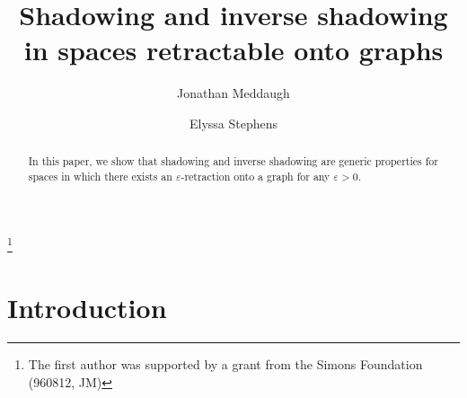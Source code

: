 \documentclass{amsart}
\numberwithin{equation}{section}
\begin{document}




\title[Graphoids]{Shadowing and inverse shadowing in spaces retractable onto graphs}

\author[J. Meddaugh]{Jonathan Meddaugh}
\address[J. Meddaugh]{Department of Mathematics, Baylor University, Waco TX, 76798}

\author[E. Stephens]{Elyssa Stephens}
\address[E. Stephens]{Department of Mathematics, Baylor University, Waco TX, 76798}

\thanks{The first author was supported by a grant from the Simons Foundation (960812, JM)}

\date{}


\begin{abstract}

In this paper, we show that shadowing and inverse shadowing are generic properties for spaces in which there exists an $\varepsilon$-retraction onto a graph for any $\varepsilon>0$.  

\end{abstract}
\maketitle


\section{Introduction}
\end{document}
